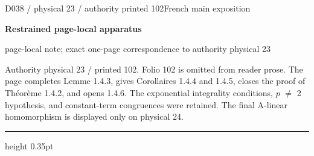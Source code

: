 \documentclass[9pt]{article}
\newcommand{\CanonText}[1]{\par{\fontsize{8.0}{9.35}\selectfont\RaggedRight #1\par}\vspace{2.2pt}}
\newcommand{\LayerTitle}{Restrained page-local apparatus}
\begin{document}
\noindent\begin{minipage}[t][\dimexpr\textheight-5pt\relax][t]{\textwidth}
{\sffamily\fontsize{7.3}{8.2}\selectfont\color{Quiet} D038 / physical 23 / authority printed 102\hfill French main exposition}
\par{}\vspace{4.5pt}
{\sffamily\fontsize{10.4}{11.6}\selectfont\bfseries\color{Accent} \LayerTitle}
\par{\sffamily\fontsize{6.7}{7.7}\selectfont\color{Quiet} page-local note; exact one-page correspondence to authority physical 23}
\vspace{5pt}
\CanonText{Authority physical 23 / printed 102. Folio 102 is omitted from reader prose. The page completes Lemme 1.4.3, gives Corollaires 1.4.4 and 1.4.5, closes the proof of Théorème 1.4.2, and opens 1.4.6. The exponential integrality conditions, \(p\) \(\neq{}\) 2 hypothesis, and constant-term congruences were retained. The final A-linear homomorphism is displayed only on physical 24.}
\vfill
{\color{Accent}\hrule height 0.35pt}\vspace{3pt}
\end{minipage}
\newpage
\end{document}
